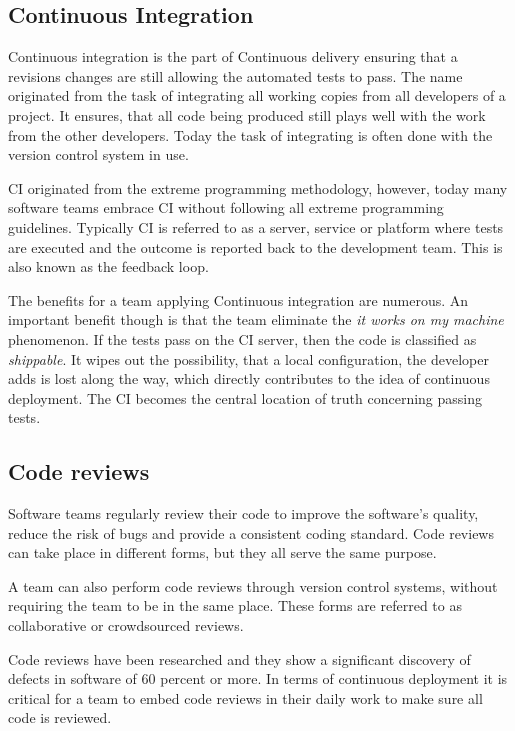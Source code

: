 \subsection{Continuous Integration}

Continuous integration is the part of Continuous delivery ensuring that a
revisions changes are still allowing the automated tests to pass. The name
originated from the task of integrating all working copies from all developers
of a project. It ensures, that all code being produced still plays well with
the work from the other developers. Today the task of integrating is often done
with the version control system in use.

CI originated from the extreme programming methodology, however, today many
software teams embrace CI without following all extreme programming guidelines.
Typically CI is referred to as a server, service or platform where tests are
executed and the outcome is reported back to the development team. This is also
known as the feedback loop.

The benefits for a team applying Continuous integration are numerous. An important
benefit though is that the team eliminate the \textit{it works on my machine}
phenomenon. If the tests pass on the CI server, then the code is classified as
\textit{shippable}. It wipes out the possibility, that a local configuration,
the developer adds is lost along the way, which directly contributes to the
idea of continuous deployment. The CI becomes the central location of truth
concerning passing tests.

\subsection{Code reviews}

Software teams regularly review their code to improve the software's quality,
reduce the risk of bugs and provide a consistent coding standard. Code reviews
can take place in different forms, but they all serve the same purpose.

A team can also perform code reviews through version control systems, without
requiring the team to be in the same place. These forms are referred to as
collaborative or crowdsourced reviews.

Code reviews have been researched and they show a significant discovery of
defects in software of 60 percent or more. In terms of continuous deployment it
is critical for a team to embed code reviews in their daily work to make sure
all code is reviewed. \cite{code_reviews}

